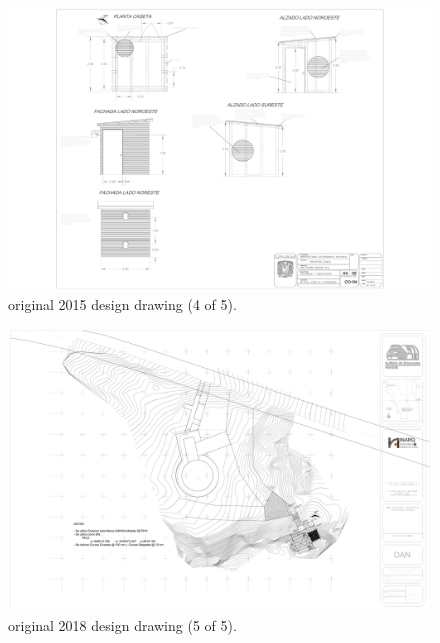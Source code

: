 \begin{figure}
\begin{center}
\includegraphics[height=0.95\linewidth,angle=90]{figures/buildings-coatli-drawing-2015-4.pdf}
\end{center}
\caption{{\projectname} original 2015 design drawing (4 of 5).}
\label{figure:buildings-drawing-2015-4}
\end{figure}

\begin{figure}
\begin{center}
\includegraphics[height=0.95\linewidth,angle=90]{figures/buildings-coatli-drawing-2015-5.pdf}
\end{center}
\caption{{\projectname} original 2018 design drawing (5 of 5).}
\label{figure:buildings-drawing-2015-5}
\end{figure}

